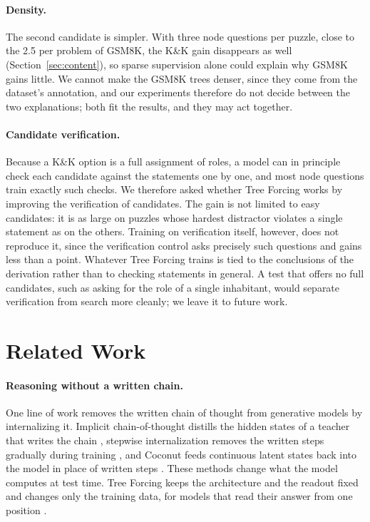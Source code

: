 \documentclass[10pt]{article}
\newcommand{\tf}{Tree Forcing}
\begin{document}
\paragraph{Density.} The second candidate is simpler. With three node questions per puzzle, close to the 2.5 per problem of GSM8K, the K\&K
gain disappears as well (Section~\ref{sec:content}), so sparse supervision alone could explain why GSM8K gains little. We
cannot make the GSM8K trees denser, since they come from the dataset's annotation, and our experiments therefore do not
decide between the two explanations; both fit the results, and they may act together.

\paragraph{Candidate verification.} Because a K\&K option is a full assignment of roles, a model can in principle check
each candidate against the statements one by one, and most node questions train exactly such checks. We therefore
asked whether \tf{} works by improving the verification of candidates. The gain is not limited to easy candidates: it
is as large on puzzles whose hardest distractor violates a single statement as on the others. Training on verification
itself, however, does not reproduce it, since the verification control asks precisely such questions and gains less
than a point. Whatever \tf{} trains is tied to the conclusions of the derivation rather than to checking statements in
general. A test that offers no full candidates, such as asking for the role of a single inhabitant, would separate
verification from search more cleanly; we leave it to future work.

\section{Related Work}
\label{sec:related}

\paragraph{Reasoning without a written chain.} One line of work removes the written chain of thought from generative
models by internalizing it. Implicit chain-of-thought distills the hidden states of a teacher that writes the chain
\citep{deng2023implicit}, stepwise internalization removes the written steps gradually during training
\citep{deng2024internalize}, and Coconut feeds continuous latent states back into the model in place of written steps
\citep{hao2024coconut}. These methods change what the model computes at test time. \tf{} keeps the architecture and
the readout fixed and changes only the training data, for models that read their answer from one position
\citep{ldm2026}.
\end{document}
